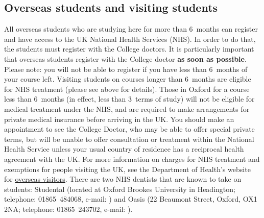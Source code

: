 \subsection{Overseas students and visiting students}
All overseas students who are studying here for more than 6~months can register
and have access to the UK National Health Services (NHS). In order to do that,
the students must register with the College doctors. It is particularly
important that overseas students register with the College doctor {\textbf{as soon as possible}}. Please note: you will not be able to register if you have less than 6~months of your course left.
Visiting students on courses longer than 6~months are eligible for NHS treatment (please see above for details). Those in Oxford for a course less than 6~months (in effect, less than 3~terms of study) will not be eligible for medical treatment under the NHS, and are required to make arrangements for private medical insurance before arriving in the UK.
You should make an appointment to see the College Doctor, who may be able to offer special private terms, but will be unable to offer consultation or treatment within the National Health Service unless your usual country of  residence has a reciprocal health agreement with the UK.
For more information on charges for NHS treatment and exemptions for people
visiting the UK, see the Department of Health's website for
\href{http://www.nhs.uk/chq/pages/1086.aspx?categoryid=68}{overseas visitors}.
There are two NHS dentists that are known to take on students: Studental (located at Oxford Brookes University in Headington; telephone: 01865~484068, e-mail: \href{mailto:reception@studental.co.uk}{}) and Oasis (22 Beaumont Street, Oxford, OX1 2NA; telephone: 01865~243702, e-mail: \href{mailto:reception.oxford@oasis-healthcare.com}{}).
